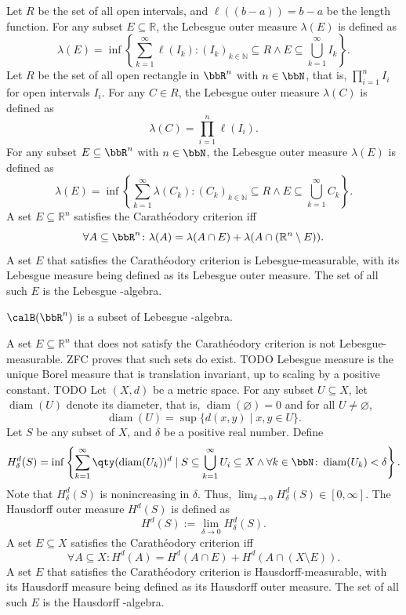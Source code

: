 \documentclass[a4paper,12pt]{article}
\begin{document}
Let $R$ be the set of all open intervals, and $\ell((b-a))=b-a$ be the length function. For any subset $E\subseteq\mathbb{R}$, the Lebesgue outer measure $\lambda(E)$ is defined as
\[\lambda(E)=\inf\left\{\sum_{k=1}^{\infty}\ell(I_k)\colon(I_k)_{k\in\mathbb{N}}\subseteq R\land E\subseteq\bigcup_{k=1}^{\infty}I_k\right\}.\]
Let $R$ be the set of all open rectangle in $\bbR^n$ with $n\in\bbN$, that is, $\prod_{i=1}^nI_i$ for open intervals $I_i$. For any $C\in R$, the Lebesgue outer measure $\lambda(C)$ is defined as
\[\lambda(C)=\prod_{i=1}^n\ell(I_i).\]
For any subset $E\subseteq\bbR^n$ with $n\in\bbN$, the Lebesgue outer measure $\lambda(E)$ is defined as
\[\lambda(E)=\inf\left\{\sum_{k=1}^{\infty}\lambda(C_k)\colon(C_k)_{k\in\mathbb{N}}\subseteq R\land E\subseteq\bigcup_{k=1}^{\infty}C_k\right\}.\]
A set $E\subseteq\mathbb{R}^n$ satisfies the Carathéodory criterion iff
\[\forall A\subseteq\bbR^n\colon\lambda(A)=\lambda(A\cap E)+\lambda(A\cap (\mathbb{R}^n\setminus E)).\]
A set $E$ that satisfies the Carathéodory criterion is Lebesgue-measurable, with its Lebesgue measure being defined as its Lebesgue outer measure. The set of all such $E$ is the Lebesgue \text{\textsigma}-algebra.

$\calB(\bbR^n)$ is a subset of Lebesgue \text{\textsigma}-algebra.

A set $E\subseteq\mathbb{R}^n$ that does not satisfy the Carathéodory criterion is not Lebesgue-measurable. ZFC proves that such sets do exist.
\bpr
TODO
\epr
{}
Lebesgue measure is the unique Borel measure that is translation invariant, up to scaling by a positive constant.
\bpr
TODO
\epr
{}
Let $(X,d)$ be a metric space. For any subset $U\subseteq X$, let $\operatorname{diam}(U)$ denote its diameter, that is, $\operatorname{diam}(\varnothing)=0$ and for all $U\ne\varnothing$,
\[\operatorname{diam}(U)=\sup\{d(x,y)\mid x,y\in U\}.\]
Let $S$ be any subset of $X$, and $\delta$ be a positive real number. Define
\[H_{\delta}^d(S)=\inf\left\{\sum_{k=1}^\infty\qty(\operatorname{diam}(U_k))^d\mid S\subseteq\bigcup_{k=1}^\infty U_i\subseteq X\land\forall k\in\bbN\colon\operatorname{diam}(U_k)<\delta\right\}.\]
Note that $H_\delta^d(S)$ is nonincreasing in $\delta$. Thus, 
$\lim_{\delta\to 0}H_\delta^d(S)\in[0,\infty]$. The Hausdorff outer measure $H^d(S)$ is defined as
\[H^d(S):=\lim_{\delta\to 0}H_\delta^d(S).\]
A set $E\subseteq X$ satisfies the Carathéodory criterion iff
\[\forall A\subseteq X\colon H^d(A)=H^d(A\cap E)+H^d(A\cap (X\setminus E)).\]
A set $E$ that satisfies the Carathéodory criterion is Hausdorff-measurable, with its Hausdorff measure being defined as its Hausdorff outer measure. The set of all such $E$ is the Hausdorff \text{\textsigma}-algebra.
\end{document}
